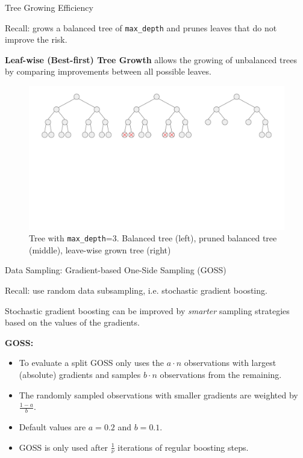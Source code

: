 \begin{vbframe}{Tree Growing Efficiency}

Recall:  grows a balanced tree of \texttt{max\_depth} and prunes leaves that do not improve the risk.

\lz

\textbf{Leaf-wise (Best-first) Tree Growth} allows the growing of unbalanced trees by comparing improvements between all possible leaves.

\lz

\begin{figure}
\includegraphics[trim=0 200 0 0, clip, width=\textwidth,page=1]{figure_man/trees_balance.pdf}
\caption{Tree with \texttt{max\_depth}=3. Balanced tree (left), pruned balanced tree (middle), leave-wise grown tree (right)}
\end{figure}

\end{vbframe}

\begin{vbframe}{Data Sampling: Gradient-based One-Side Sampling (GOSS)}

Recall:  use random data subsampling, i.e. stochastic gradient boosting.

\lz

Stochastic gradient boosting can be improved by \emph{smarter} sampling strategies based on the values of the gradients.

\lz

\textbf{GOSS:}
\begin{itemize}
  \item To evaluate a split GOSS only uses the $a\cdot n$ observations with largest (absolute) gradients and samples $b\cdot n$ observations from the remaining.
  \item The randomly sampled observations with smaller gradients are weighted by $\frac{1 - a}{b}$.
  \item Default values are $a=0.2$ and $b=0.1$.
  \item GOSS is only used after $\frac{1}{\nu}$ iterations of regular boosting steps.
\end{itemize}


\end{vbframe}

